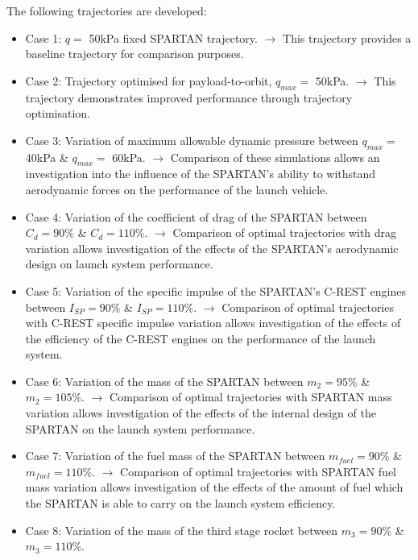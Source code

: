 The following trajectories are developed: 
\begin{itemize}
	
	\item Case 1: $q = $ 50kPa fixed SPARTAN trajectory. \newline$\rightarrow$ This trajectory provides a baseline trajectory for comparison purposes.
	\item Case 2: Trajectory optimised for payload-to-orbit, $q_{max} = $ 50kPa. \newline$\rightarrow$ This trajectory demonstrates improved performance through trajectory optimisation.
	\item Case 3: Variation of maximum allowable dynamic pressure between $q_{max} = $ 40kPa \& $q_{max} = $ 60kPa. 
	\newline$\rightarrow$ Comparison of these simulations allows an investigation into the influence of the SPARTAN's ability to withstand aerodynamic forces on the performance of the launch vehicle.
	\item Case 4: Variation of the coefficient of drag of the SPARTAN between $C_d = 90\%$ \& $C_d = 110\%$. 
	\newline$\rightarrow$ Comparison of optimal trajectories with drag variation allows investigation of the effects of the SPARTAN's aerodynamic design on launch system performance.
	\item Case 5: Variation of the specific impulse of the SPARTAN's C-REST engines between $I_{SP} = 90\%$ \& $I_{SP} = 110\%$. 
	\newline$\rightarrow$ Comparison of optimal trajectories with C-REST specific impulse variation allows investigation of the effects of the efficiency of the C-REST engines on the performance of the launch system. 
	\item Case 6: Variation of the mass of the SPARTAN between $m_2 = 95\%$ \& $m_2 = 105\%$. 
	\newline$\rightarrow$ Comparison of optimal trajectories with SPARTAN mass variation allows investigation of the effects of the internal design of the SPARTAN on the launch system performance. 
	\item Case 7: Variation of the fuel mass of the SPARTAN between $m_{fuel} = 90\%$ \& $m_{fuel} = 110\%$. 
	\newline$\rightarrow$ Comparison of optimal trajectories with SPARTAN fuel mass variation allows investigation of the effects of the amount of fuel which the SPARTAN is able to carry on the launch system efficiency. 
	\item Case 8: Variation of the mass of the third stage rocket between $m_3 = 90\%$ \& $m_3 = 110\%$. 

\end{itemize}
